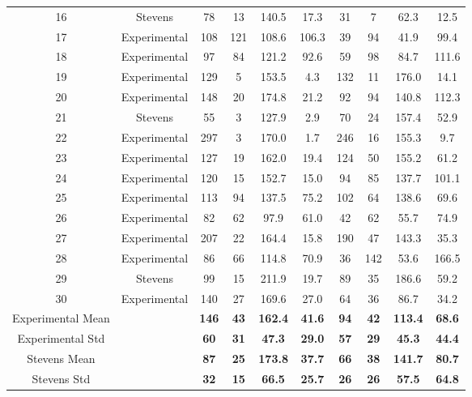\begin{table}[!ht]
{\begin{tabular}{|c|c|c|c|c|c|c|c|c|c|}
16 & Stevens     & 78  & 13 & 140.5 & 17.3 & 31  & 7  & 62.3 & 12.5 \\
17 & Experimental & 108 & 121 & 108.6 & 106.3 & 39 & 94 & 41.9 & 99.4 \\
18 & Experimental & 97  & 84 & 121.2 & 92.6 & 59  & 98 & 84.7 & 111.6 \\
19 & Experimental & 129 & 5  & 153.5 & 4.3 & 132 & 11 & 176.0 & 14.1 \\
20 & Experimental & 148 & 20 & 174.8 & 21.2 & 92  & 94 & 140.8 & 112.3 \\
21 & Stevens     & 55  & 3  & 127.9 & 2.9 & 70  & 24 & 157.4 & 52.9 \\
22 & Experimental & 297 & 3  & 170.0 & 1.7 & 246 & 16 & 155.3 & 9.7 \\
23 & Experimental & 127 & 19 & 162.0 & 19.4 & 124 & 50 & 155.2 & 61.2 \\
24 & Experimental & 120 & 15 & 152.7 & 15.0 & 94  & 85 & 137.7 & 101.1 \\
25 & Experimental & 113 & 94 & 137.5 & 75.2 & 102 & 64 & 138.6 & 69.6 \\
26 & Experimental & 82  & 62 & 97.9  & 61.0 & 42  & 62 & 55.7 & 74.9 \\
27 & Experimental & 207 & 22 & 164.4 & 15.8 & 190 & 47 & 143.3 & 35.3 \\
28 & Experimental & 86  & 66 & 114.8 & 70.9 & 36  & 142 & 53.6 & 166.5 \\
29 & Stevens     & 99  & 15 & 211.9 & 19.7 & 89  & 35 & 186.6 & 59.2 \\
30 & Experimental & 140 & 27 & 169.6 & 27.0 & 64  & 36 & 86.7 & 34.2 \\
\hline
\rowcolor{lightgray} Experimental Mean &  & \textbf{146} & \textbf{43} & \textbf{162.4} & \textbf{41.6} & \textbf{94} & \textbf{42} & \textbf{113.4} & \textbf{68.6} \\
\rowcolor{lightgray} Experimental Std  &  & \textbf{60}  & \textbf{31} & \textbf{47.3}  & \textbf{29.0} & \textbf{57} & \textbf{29} & \textbf{45.3}  & \textbf{44.4} \\
\rowcolor{lightgray} Stevens Mean      &  & \textbf{87}  & \textbf{25} & \textbf{173.8} & \textbf{37.7} & \textbf{66} & \textbf{38} & \textbf{141.7} & \textbf{80.7} \\
\rowcolor{lightgray} Stevens Std       &  & \textbf{32}  & \textbf{15} & \textbf{66.5}  & \textbf{25.7} & \textbf{26} & \textbf{26} & \textbf{57.5}  & \textbf{64.8} \\
\hline
\end{tabular}}
\end{table}

